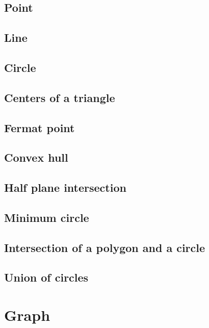 \documentclass[titlepage, a4paper,10pt]{article}
\begin{document}
\begin{multicols}{2}
\begin{spacing}{0.6}
			\subsection{Point}
				
			\subsection{Line}
				
			\subsection{Circle}
				
			\subsection{Centers of a triangle}
				
			\subsection{Fermat point}
				
			\subsection{Convex hull}
				
			\subsection{Half plane intersection}
				
			\subsection{Minimum circle}
				
			\subsection{Intersection of a polygon and a circle}
				
			\subsection{Union of circles}
				
		\section{Graph}

\end{spacing}
\end{multicols}
\end{document}
